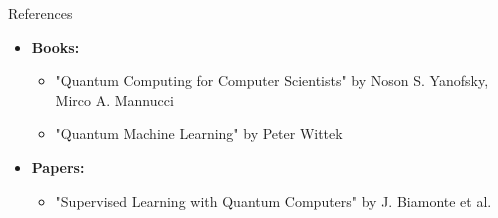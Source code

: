 \documentclass{beamer}
\begin{document}
\begin{frame}{References}
    \begin{itemize}
        \item \textbf{Books:}
        \begin{itemize}
            \item "Quantum Computing for Computer Scientists" by Noson S. Yanofsky, Mirco A. Mannucci
            \item "Quantum Machine Learning" by Peter Wittek
        \end{itemize}
        \item \textbf{Papers:}
        \begin{itemize}
            \item "Supervised Learning with Quantum Computers" by J. Biamonte et al.
        \end{itemize}
    \end{itemize}
\end{frame}
\end{document}

